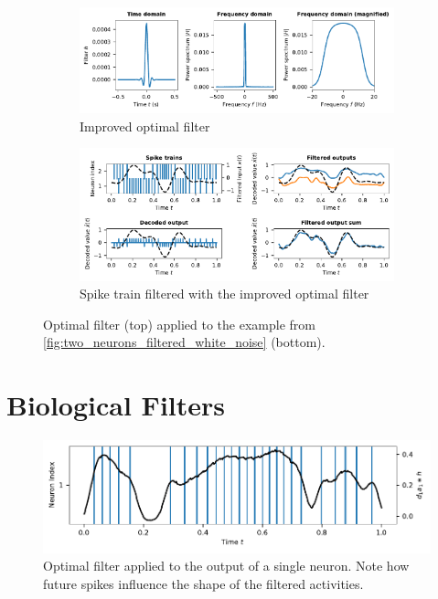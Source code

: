 \documentclass[10pt,letterpaper,oneside]{article}
\begin{document}

\begin{figure}
	\begin{subfigure}{\textwidth}
		\centering
		\includegraphics{media/optimal_filter_improved.pdf}
		\caption{Improved optimal filter}
		\label{fig:optimal_filter_improved}
	\end{subfigure}
	\begin{subfigure}{\textwidth}
		\centering
		\includegraphics{media/two_neurons_filtered_optimal_small.pdf}
		\caption{Spike train filtered with the improved optimal filter}
	\end{subfigure}
	\caption{Optimal filter (top) applied to the example from \cref{fig:two_neurons_filtered_white_noise} (bottom). }
	\label{fig:filter_improved}
\end{figure}

\newpage

\section{Biological Filters}

\begin{figure}
	\includegraphics{media/filter_magnification.pdf}
	\caption{Optimal filter applied to the output of a single neuron. Note how future spikes influence the shape of the filtered activities.}
	\label{fig:filter_magnification}
\end{figure}
\end{document}
